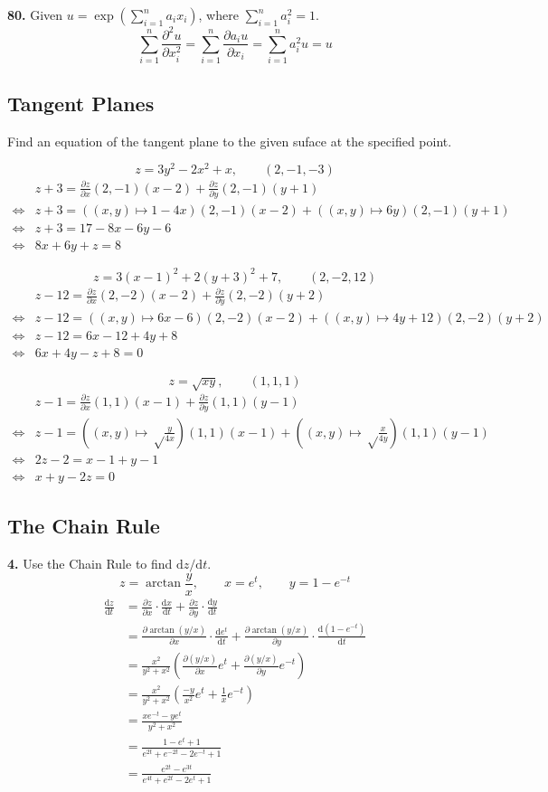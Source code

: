 \documentclass[a4paper,12pt]{article}
\newcommand{\anonym}[2]{\left(#1 \mapsto #2\right)}
\newcommand{\tho}[3][]{\frac{\partial #1 #2}{\partial #3 #1}}
\newcommand{\leibniz}[3][]{\frac{\mathrm{d} #1 #2}{\mathrm{d} #3 #1}}
\newcommand{\exercise}[1]{\noindent\textbf{#1.}}
\begin{document}
\exercise{80} Given $u = \exp\left(\sum_{i=1}^n a_i x_i\right)$,
where $\sum_{i=1}^n a_i^2 = 1$.
\[\sum_{i=1}^n\tho[^2]{u}{x_i}
= \sum_{i=1}^n\tho{a_i u}{x_i}
= \sum_{i=1}^n a_i^2 u
= u\]

\subsection{Tangent Planes}
Find an equation of the tangent plane to the given suface
at the specified point.

\[z = 3y^2 - 2x^2 + x,\qquad (2, -1, -3)\tag{1}\]
\begin{align*}
     &z + 3 = \tho{z}{x}(2,-1)(x-2) + \tho{z}{y}(2,-1)(y+1)\\
\iff &z + 3 = \anonym{(x,y)}{1-4x}(2,-1)(x-2) + \anonym{(x,y)}{6y}(2,-1)(y+1)\\
\iff &z + 3 = 17 - 8x - 6y - 6\\
\iff &8x + 6y + z = 8
\end{align*}

\[z = 3(x - 1)^2 + 2(y + 3)^2 + 7,\qquad (2, -2, 12)\tag{2}\]
\begin{align*}
     &z - 12 = \tho{z}{x}(2, -2)(x - 2) + \tho{z}{y}(2, -2)(y + 2)\\
\iff &z - 12 = \anonym{(x, y)}{6x - 6}(2, -2)(x - 2)
             + \anonym{(x, y)}{4y + 12}(2, -2)(y + 2)\\
\iff &z - 12 = 6x - 12 + 4y + 8\\
\iff &6x + 4y - z + 8 = 0
\end{align*}

\[z = \sqrt{xy},\qquad (1, 1, 1)\tag{3}\]
\begin{align*}
     &z - 1 = \tho{z}{x}(1, 1)(x - 1) + \tho{z}{y}(1, 1)(y - 1)\\
\iff &z - 1 = \anonym{(x, y)}{\sqrt\frac{y}{4x}}(1, 1)(x - 1)
            + \anonym{(x, y)}{\sqrt\frac{x}{4y}}(1, 1)(y - 1)\\
\iff &2z - 2 = x - 1 + y - 1\\
\iff &x + y - 2z = 0
\end{align*}

\subsection{The Chain Rule}
\exercise{4} Use the Chain Rule to find $\mathrm{d} z/\mathrm{d} t$.
\[z = \arctan\frac{y}{x},\qquad x = e^t,\qquad y = 1-e^{-t}\]
\begin{align*}
   \leibniz{z}{t}
&= \tho{z}{x}\cdot\leibniz{x}{t} + \tho{z}{y}\cdot\leibniz{y}{t}\\
&= \tho{\arctan(y/x)}{x}\cdot\leibniz{e^t}{t}
 + \tho{\arctan(y/x)}{y}\cdot\leibniz{\left(1 - e^{-t}\right)}{t}\\
&= \frac{x^2}{y^2 + x^2}\left(\tho{(y/x)}{x}e^t + \tho{(y/x)}{y}e^{-t}\right)\\
&= \frac{x^2}{y^2 + x^2}\left(\frac{-y}{x^2}e^t + \frac{1}{x}e^{-t}\right)\\
&= \frac{xe^{-t} - ye^t}{y^2 + x^2}\\
&= \frac{1 - e^t + 1}{e^{2t} + e^{-2t} - 2e^{-t} + 1}\\
&= \frac{e^{2t} - e^{3t}}{e^{4t} +e^{2t} - 2e^t + 1}
\end{align*}
\end{document}

